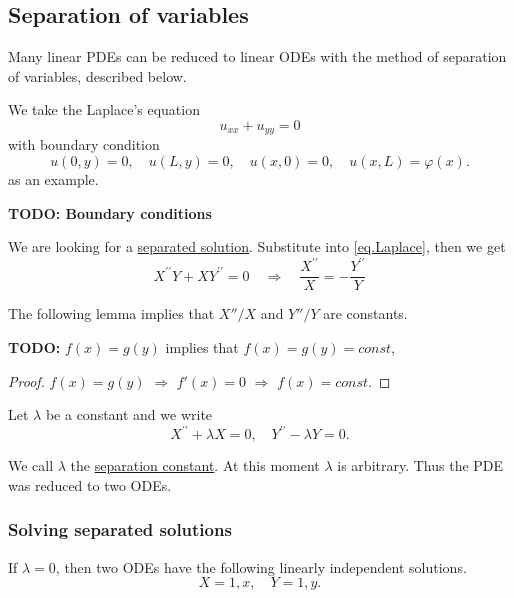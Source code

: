 \subsection{Separation of variables}
Many linear PDEs can be reduced to linear ODEs with the method of separation of
variables, described below.

We take the Laplace's equation
\begin{equation}\label{eq.Laplace}
    u_{x x}+u_{y y}=0
\end{equation}
with boundary condition
\begin{equation}\label{eq.Laplace_boundary}
    u(0, y)=0, \quad u(L, y)=0, \quad u(x, 0)=0, \quad u(x, L)=\varphi(x).
\end{equation}
as an example.

\textbf{TODO: Boundary conditions}

We are looking for a \underline{separated solution}. Substitute into \eqref{eq.Laplace}, then we get 
\begin{equation*}
    X^{\prime \prime} Y+X Y^{\prime \prime}=0 \quad\Rightarrow\quad
    \frac{X^{\prime \prime}}{X}= -\frac{Y^{\prime \prime}}{Y}
\end{equation*}

The following lemma implies that $X''/X$ and $Y''/Y$ are constants.

\begin{lemma}[]
    \textbf{TODO: } $f(x) = g(y)$ implies that $f(x) = g(y) = \textit{const}$,
\end{lemma}
\begin{proof}
    $f(x) = g(y)$ $\Rightarrow$ $f'(x) = 0$ $\Rightarrow$ $f(x) = \textit{const}$.
\end{proof}

Let $\lambda$ be a constant and we write
\begin{equation*}
    X^{\prime \prime}+\lambda X=0, \quad Y^{\prime \prime}-\lambda Y=0 .
\end{equation*}

We call $\lambda$ the \underline{separation constant}. At this moment $\lambda$ is arbitrary. Thus the PDE was reduced to two ODEs.

\subsubsection{Solving separated solutions}

If $\lambda=0$, then two ODEs have the following linearly independent solutions.
\begin{equation}\label{eq.separated_basis_0}
X=1, x, \quad Y=1, y.
\end{equation}

